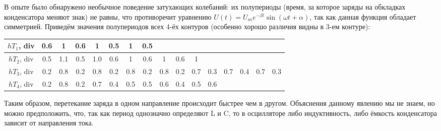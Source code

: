 \documentclass[ a4paper]{article}
\begin{document}
В опыте было обнаружено необычное  поведение затухающих колебаний: их полупериоды (время, за которое заряды на обкладках конденсатора меняют знак) 
не равны, что противоречит уравнению $U(t)=U_me^{-\beta t}\sin(\omega t + \alpha)$, так как данная функция обладает симметрией. 
Приведём значения полупериодов всех 4-ёх контуров (особенно хорошо различия видны в 3-ем контуре):
\begin{center}
	\begin{tabular}{|c|c|c|c|c|c|c|c|c|c|c|c|c|c|c|c|}
		\hline
		$hT_1$, div&  0.6& 1 & 0.6& 1 & 0.5& 1 & 0.5& & & & & & && \\
		\hline
		$hT_2$, div&  0.5& 1.1& 0.5& 1.0 & 0.6& 1 & 0.6& 1 & 0.6& 1 & & & && \\
		\hline
		$hT_3$, div& 0.2& 0.8& 0.2& 0.8& 0.2& 0.8& 0.2& 0.8& 0.2& 0.7& 0.3& 0.7& 0.4& 0.7& 0.3 \\
		\hline
		$hT_4$, div&0.2& 0.8& 0.2& 0.7& 0.4& 0.5& 0.5& 0.6& 0.4& 0.5& 0.6& & & &\\
		\hline
	\end{tabular}
\end{center}

Таким образом, перетекание заряда в одном направление происходит быстрее чем в другом. 
Объяснения данному явлению мы не знаем, но можно предположить, что, так как период однозначно определяют L и C, то 
в осцилляторе либо  индуктивность, либо ёмкость конденсатора зависит от направления тока.\\
\end{document}

